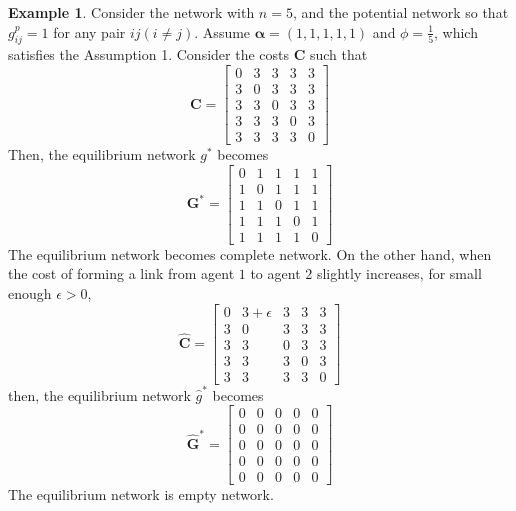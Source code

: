\documentclass[12pt]{article}
\theoremstyle{definition}
\newtheorem{example}{Example}
\begin{document}
\begin{example}
Consider the network with $n = 5$, and the potential network so that $g_{ij}^p = 1$ for any pair $ij(i \neq j)$.
Assume $\bm{\alpha} = (1, 1, 1, 1, 1)$ and $\phi = \frac{1}{5}$, which satisfies the Assumption 1.
Consider the costs $\bm{C}$ such that
\[ \bm{C} = \left[
			\begin{array}{ccccc}
				0 & 3 & 3 & 3 & 3 \\
				3 & 0 & 3 & 3 & 3 \\
				3 & 3 & 0 & 3 & 3 \\
				3 & 3 & 3 & 0 & 3  \\
				3 & 3 & 3 & 3 & 0
			\end{array} \right] \]
Then, the equilibrium network $g^*$ becomes
\[\bm{G}^* = \left[
			\begin{array}{ccccc}
				0 & 1 & 1 & 1 & 1 \\
				1 & 0 & 1 & 1 & 1 \\
				1 & 1 & 0 & 1 & 1 \\
				1 & 1 & 1 & 0 & 1 \\
				1 & 1 & 1 & 1 & 0
			\end{array} \right] \]
The equilibrium network becomes complete network.
On the other hand, when the cost of forming a link from agent $1$ to agent $2$ slightly increases, for small enough $\epsilon > 0$,
\[ \bm{\hat{C}} = \left[
			\begin{array}{ccccc}
				0 & 3 + \epsilon & 3 & 3 & 3 \\
				3 & 0 & 3 & 3 & 3 \\
				3 & 3 & 0 & 3 & 3 \\
				3 & 3 & 3 & 0 & 3  \\
				3 & 3 & 3 & 3 & 0
			\end{array} \right] \]
then, the equilibrium network $\hat{g}^*$ becomes
\[ \bm{\hat{G}}^* = \left[
			\begin{array}{ccccc}
				0 & 0 & 0 & 0 & 0 \\
				0 & 0 & 0 & 0 & 0 \\
				0 & 0 & 0 & 0 & 0 \\
				0 & 0 & 0 & 0 & 0 \\
				0 & 0 & 0 & 0 & 0
			\end{array} \right] \]
The equilibrium network is empty network.
\end{example}
\end{document}
